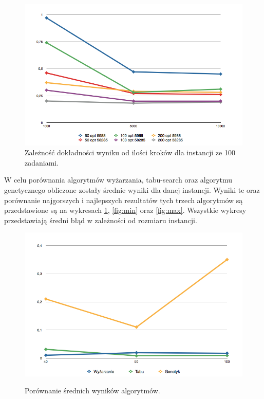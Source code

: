   \begin{figure}[h!]
  \begin{center}
  \caption{Zależność dokładności wyniku od ilości kroków dla instancji ze 100 zadaniami.}
  \includegraphics[scale=.6]{images/100.png}
  \end{center}
  \end{figure}

  \newpage
  W celu porównania algorytmów wyżarzania, tabu-search oraz algorytmu
  genetycznego obliczone zostały średnie wyniki dla danej instancji. Wyniki te
  oraz porównanie najgorszych i najlepszych rezultatów tych trzech algorytmów są
  przedstawione są na wykresach \ref{fig:cmp}, \ref{fig:min} oraz \ref{fig:max}.
  Wszystkie wykresy przedstawiają średni błąd w zależności od rozmiaru instancji.

  \begin{figure}[h!]
  \begin{center}
  \caption{Porównanie średnich wyników algorytmów.}
  \includegraphics[scale=.6]{images/cmp.png}
  \label{fig:cmp}
  \end{center}
  \end{figure}

